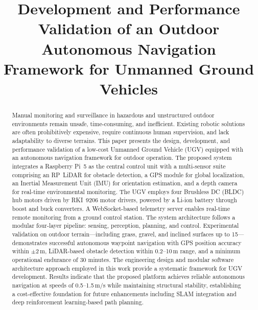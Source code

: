 \documentclass[conference]{IEEEtran}
\begin{document}
\title{Development and Performance Validation of an Outdoor Autonomous Navigation Framework for Unmanned Ground Vehicles}

\author{
}

\maketitle

\begin{abstract}
Manual monitoring and surveillance in hazardous and unstructured outdoor environments remain unsafe, time-consuming, and inefficient. Existing robotic solutions are often prohibitively expensive, require continuous human supervision, and lack adaptability to diverse terrains. This paper presents the design, development, and performance validation of a low-cost Unmanned Ground Vehicle (UGV) equipped with an autonomous navigation framework for outdoor operation. The proposed system integrates a Raspberry Pi~5 as the central control unit with a multi-sensor suite comprising an RP~LiDAR for obstacle detection, a GPS module for global localization, an Inertial Measurement Unit (IMU) for orientation estimation, and a depth camera for real-time environmental monitoring. The UGV employs four Brushless DC (BLDC) hub motors driven by RKI~9206 motor drivers, powered by a Li-ion battery through boost and buck converters. A WebSocket-based telemetry server enables real-time remote monitoring from a ground control station. The system architecture follows a modular four-layer pipeline: sensing, perception, planning, and control. Experimental validation on outdoor terrain---including grass, gravel, and inclined surfaces up to 15\textdegree---demonstrates successful autonomous waypoint navigation with GPS position accuracy within $\pm$2\,m, LiDAR-based obstacle detection within 0.2--10\,m range, and a minimum operational endurance of 30 minutes. The engineering design and modular software architecture approach employed in this work provide a systematic framework for UGV development. Results indicate that the proposed platform achieves reliable autonomous navigation at speeds of 0.5--1.5\,m/s while maintaining structural stability, establishing a cost-effective foundation for future enhancements including SLAM integration and deep reinforcement learning-based path planning.
\end{abstract}
\end{document}
